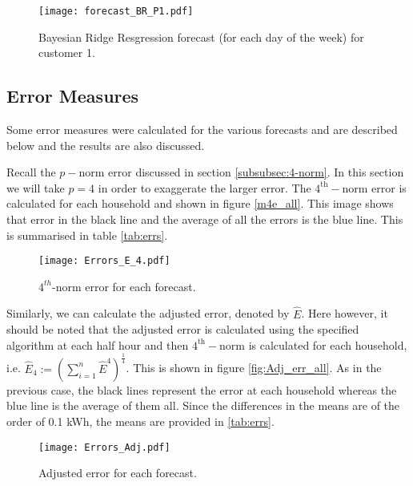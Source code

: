 \documentclass[a4paper]{article}
\begin{document}
\begin{figure}
\centering
\texttt{[image: forecast\_BR\_P1.pdf]}
\caption{Bayesian Ridge Resgression forecast (for each day of the week) for customer 1.}
\label{fig:BR_forecast_P1} 
\end{figure}


\subsection{Error Measures}
\label{subsec:errs}
Some error measures were calculated for the various forecasts and are described below and the results are also discussed.


Recall the $p-$norm error discussed in section \ref{subsubsec:4-norm}. In this section we will take $p=4$ in order to exaggerate the larger error. The $4^{\text{th}}-$norm error is calculated for each household and shown in figure \ref{m4e_all}. This image shows that error in the black line and the average of all the errors is the blue line. This is summarised in table \ref{tab:errs}.

\begin{figure}
\centering
\texttt{[image: Errors\_E\_4.pdf]}
\caption{\label{fig:m4e_all} $4^{th}$-norm error for each forecast.}
\end{figure}

Similarly, we can calculate the adjusted error, denoted by $\hat{E}$. Here however, it should be noted that the adjusted error is calculated using the specified algorithm at each half hour and then $4^{\text{th}}-$norm is calculated for each household, i.e. $\hat{E}_4 := \left( \sum_{i=1}^{n} \hat{E}^4\right)^{\frac{1}{4}}$. This is shown in figure \ref{fig:Adj_err_all}. As in the previous case, the black lines represent the error at each household whereas the blue line is the average of them all. Since the differences in the means are of the order of 0.1 kWh, the means are provided in \ref{tab:errs}.

\begin{figure}
\centering
\texttt{[image: Errors\_Adj.pdf]}
\caption{\label{fig:Adj_err_alll} Adjusted error for each forecast.}
\end{figure}
\end{document}

